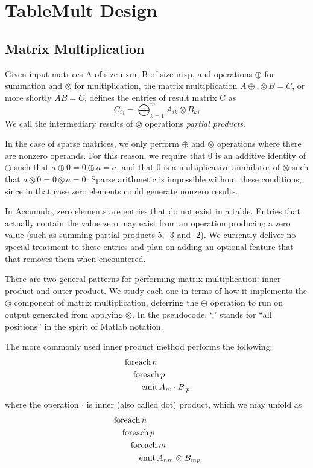 
\section{TableMult Design}
\label{sDesign}


\subsection{Matrix Multiplication}
Given input matrices A of size nxm, B of size mxp,
and operations $\oplus$ for summation and $\otimes$ for multiplication,
the matrix multiplication $A \oplus.\otimes B = C$, or more shortly $AB = C$,
defines the entries of result matrix C as 
\[ C_{ij} = \bigoplus_{k=1}^m A_{ik} \otimes B_{kj} \]
We call the intermediary results of $\otimes$ operations \emph{partial products}.

In the case of sparse matrices, we only perform $\oplus$ and $\otimes$ operations where there are nonzero operands.
For this reason, we require that 0 is an additive identity of $\oplus$ such that $a \oplus 0 = 0 \oplus a = a$,
and that 0 is a multiplicative annhilator of $\otimes$ such that $a \otimes 0 = 0 \otimes a = 0$.
Sparse arithmetic is impossible without these conditions, since in that case zero elements could generate nonzero results.

In Accumulo, zero elements are entries that do not exist in a table. Entries that actually contain the value zero may exist
from an operation producing a zero value (such as summing partial products 5, -3 and -2).  
We currently deliver no special treatment to these entries and plan on adding
an optional feature that that removes them when encountered.

There are two general patterns for performing matrix multiplication: inner product and outer product.
We study each one in terms of how it implements the $\otimes$ component of matrix multiplication,
deferring the $\oplus$ operation to run on output generated from applying $\otimes$.
In the pseudocode, `:' stands for ``all positions'' in the spirit of Matlab notation.

The more commonly used inner product method performs the following:
\begin{align*}
&\operatorname{foreach} n \\
&\quad\operatorname{foreach} p \\
&\quad\quad\operatorname{emit} A_{n:} \cdot B_{:p} 
\end{align*}
where the operation $\cdot$ is inner (also called dot) product, which we may unfold as
\begin{align*}
&\operatorname{foreach} n \\
&\quad\operatorname{foreach} p \\
&\quad\quad\operatorname{foreach} m \\
&\quad\quad\quad\operatorname{emit} A_{nm} \otimes B_{mp} 
\end{align*}

